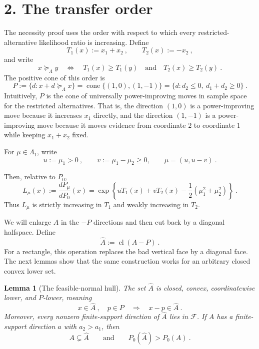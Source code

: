 \documentclass[12pt]{article}
\newtheorem{lemma}{Lemma}
\theoremstyle{remark}
\begin{document}
\section*{2. The transfer order}

The necessity proof uses the order with respect to which every restricted-alternative likelihood ratio is increasing.  Define
\[
T_1(x):=x_1+x_2~,
\qquad
T_2(x):=-x_2~,
\]
and write
\[
x\succeq_\Lambda y
\quad\Longleftrightarrow\quad
T_1(x)\ge T_1(y)
\quad\text{and}\quad
T_2(x)\ge T_2(y)~.
\]
The positive cone of this order is
\[
P:=\{d:x+d\succeq_\Lambda x\}
  =\operatorname{cone}\{(1,0),(1,-1)\}
  =\{d:d_2\le0,\ d_1+d_2\ge0\}~.
\]
Intuitively, $P$ is the cone of universally power-improving moves in sample space for the restricted alternatives. That is, the direction $(1,0)$ is a power-improving move because it increases $x_1$ directly, and the direction $(1,-1)$ is a power-improving move because it moves evidence from coordinate $2$ to coordinate $1$ while keeping $x_1+x_2$ fixed.

For $\mu\in\Lambda_1$, write
\[ u:=\mu_1>0~,
\qquad
v:=\mu_1-\mu_2\ge0, \qquad 
\mu=(u,u-v)~.
\]

Then, relative to $P_0$,
\begin{equation}\label{eq:LR-density}
L_\mu(x):=\frac{dP_\mu}{dP_0}(x)
=
\exp\left\{uT_1(x)+vT_2(x)-\frac12(\mu_1^2+\mu_2^2)\right\}~.
\end{equation}
Thus $L_\mu$ is strictly increasing in $T_1$ and weakly increasing in $T_2$.

We will enlarge $A$ in the $-P$ directions and then cut back by a diagonal halfspace.  Define
\[
\widehat A:=\operatorname{cl}(A-P)~.
\]
For a rectangle, this operation replaces the bad vertical face by a diagonal face.  The next lemmas show that the same construction works for an arbitrary closed convex lower set.

\begin{lemma}[The feasible-normal hull]\label{lem:hull}
The set $\widehat A$ is closed, convex, coordinatewise lower, and $P$-lower, meaning
\[
x\in\widehat A~,
\quad p\in P
\quad\Longrightarrow\quad
x-p\in\widehat A~.
\]
Moreover, every nonzero finite-support direction of $\widehat A$ lies in $\mathcal F$.  If $A$ has a finite-support direction $a$ with $a_2>a_1$, then
\[
A\subsetneq \widehat A
\qquad\text{and}\qquad
P_0(\widehat A)>P_0(A)~.
\]
\end{lemma}
\end{document}
